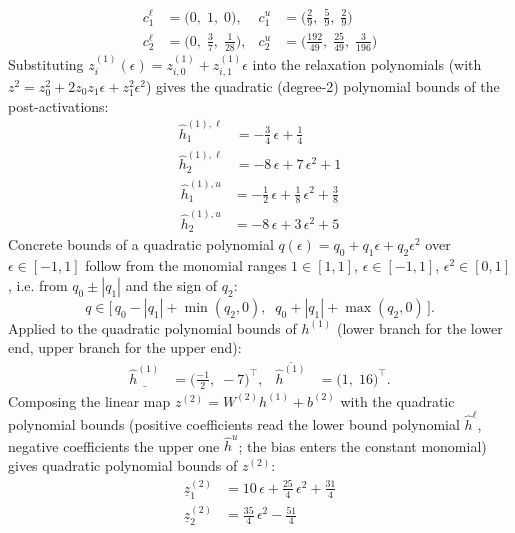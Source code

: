 \documentclass[11pt]{article}
\begin{document}
\begin{align*}
c^{\ell}_{1} &= \bigl(0,\; 1,\; 0\bigr), & c^{u}_{1} &= \bigl(\frac{2}{9},\; \frac{5}{9},\; \frac{2}{9}\bigr) \\
c^{\ell}_{2} &= \bigl(0,\; \frac{3}{7},\; \frac{1}{28}\bigr), & c^{u}_{2} &= \bigl(\frac{192}{49},\; \frac{25}{49},\; \frac{3}{196}\bigr)
\end{align*}
Substituting $z^{(1)}_i(\epsilon) = z^{(1)}_{i,0} + z^{(1)}_{i,1} \epsilon$ into the relaxation
polynomials (with $z^2 = z_0^2 + 2 z_0 z_1 \epsilon + z_1^2 \epsilon^2$) gives the quadratic
(degree-2) polynomial bounds of the post-activations:
\begin{align*}
\hat{h}^{(1),\ell}_{1} &= -\frac{3}{4}\,\epsilon + \frac{1}{4} \\
\hat{h}^{(1),\ell}_{2} &= -8\,\epsilon + 7\,\epsilon^2 + 1
\end{align*}
\begin{align*}
\hat{h}^{(1),u}_{1} &= -\frac{1}{2}\,\epsilon + \frac{1}{8}\,\epsilon^2 + \frac{3}{8} \\
\hat{h}^{(1),u}_{2} &= -8\,\epsilon + 3\,\epsilon^2 + 5
\end{align*}
Concrete bounds of a quadratic polynomial $q(\epsilon) = q_0 + q_1 \epsilon + q_2 \epsilon^2$ over
$\epsilon \in [-1, 1]$ follow from the monomial ranges $1 \in [1, 1]$, $\epsilon \in [-1, 1]$,
$\epsilon^2 \in [0, 1]$, i.e. from $q_0 \pm |q_1|$ and the sign of $q_2$:
\begin{equation*}
q \in \bigl[\, q_0 - |q_1| + \min(q_2, 0), \;\; q_0 + |q_1| + \max(q_2, 0) \,\bigr].
\end{equation*}
Applied to the quadratic polynomial bounds of $h^{(1)}$ (lower branch for the lower end, upper branch for the upper end):
\begin{align*}
\underline{\hat{h}^{(1)}} &= \bigl(\frac{-1}{2},\; -7\bigr)^{\!\top}, & \overline{\hat{h}^{(1)}} &= \bigl(1,\; 16\bigr)^{\!\top}.
\end{align*}
Composing the linear map $z^{(2)} = W^{(2)} h^{(1)} + b^{(2)}$ with the quadratic polynomial bounds
(positive coefficients read the lower bound polynomial $\hat{h}^{\ell}$, negative coefficients the
upper one $\hat{h}^{u}$; the bias enters the constant monomial) gives quadratic polynomial bounds of
$z^{(2)}$:
\begin{align*}
\underline{z}^{(2)}_{1} &= 10\,\epsilon + \frac{25}{4}\,\epsilon^2 + \frac{31}{4} \\
\underline{z}^{(2)}_{2} &= \frac{35}{4}\,\epsilon^2 - \frac{51}{4}
\end{align*}
\end{document}
